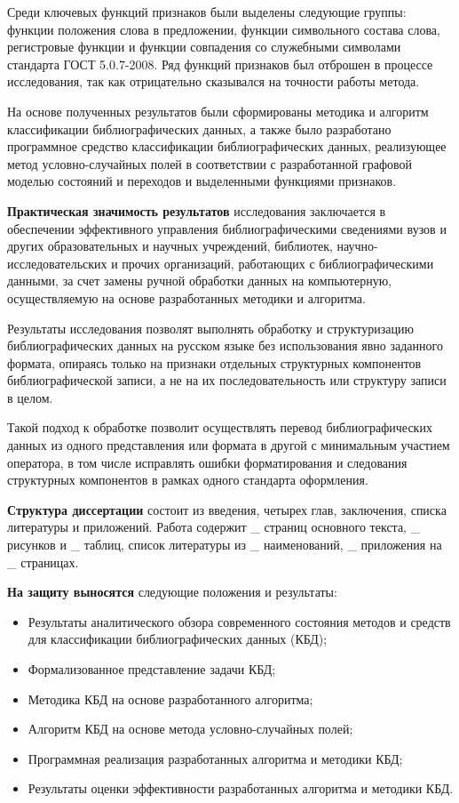 Среди ключевых функций признаков были выделены следующие группы: функции положения слова в предложении, функции символьного состава слова, регистровые функции и функции совпадения со служебными символами стандарта ГОСТ 5.0.7-2008. Ряд функций признаков был отброшен в процессе исследования, так как отрицательно сказывался на точности работы метода.

На основе полученных результатов были сформированы методика и алгоритм классификации библиографических данных, а также было разработано программное средство классификации библиографических данных, реализующее метод условно-случайных полей в соответствии с разработанной графовой моделью состояний и переходов и выделенными функциями признаков.

\textbf{Практическая значимость результатов} исследования заключается в обеспечении эффективного управления библиографическими сведениями вузов и других образовательных и научных учреждений, библиотек, научно-исследовательских и прочих организаций, работающих с библиографическими данными, за счет замены ручной обработки данных на компьютерную, осуществляемую на основе разработанных методики и алгоритма.

Результаты исследования позволят выполнять обработку и структуризацию библиографических данных на русском языке без использования явно заданного формата, опираясь только на признаки отдельных структурных компонентов библиографической записи, а не на их последовательность или структуру записи в целом.

Такой подход к обработке позволит осуществлять перевод библиографических данных из одного представления или формата в другой с минимальным участием оператора, в том числе исправлять ошибки форматирования и следования структурных компонентов в рамках одного стандарта оформления.

\textbf{Структура диссертации} состоит из введения, четырех глав, заключения, списка литературы и приложений. Работа содержит \_ страниц основного текста, \_ рисунков и \_ таблиц, список литературы из \_ наименований, \_ приложения на \_ страницах.

\textbf{На защиту выносятся} следующие положения и результаты:
\begin{itemize}
	\item Результаты аналитического обзора современного состояния методов и средств для классификации библиографических данных (КБД);
	\item Формализованное представление задачи КБД;
	\item Методика КБД на основе разработанного алгоритма;
	\item Алгоритм КБД на основе метода условно-случайных полей;
	\item Программная реализация разработанных алгоритма и методики КБД;
	\item Результаты оценки эффективности разработанных алгоритма и методики КБД.
\end{itemize}
